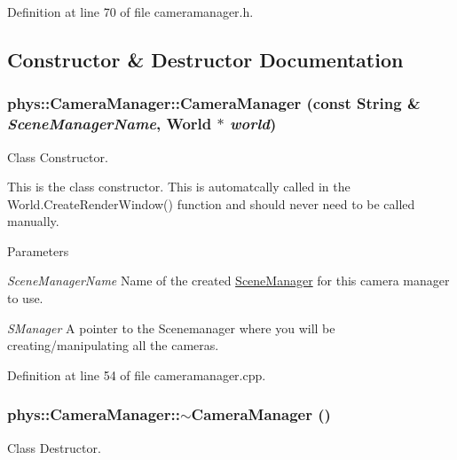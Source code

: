 Definition at line 70 of file cameramanager.h.



\subsection{Constructor \& Destructor Documentation}
\hypertarget{classphys_1_1CameraManager_a1e659b4a07645965194a33f8439fa4ea}{
\subsubsection[{CameraManager}]{\setlength{\rightskip}{0pt plus 5cm}phys::CameraManager::CameraManager (const {\bf String} \& {\em SceneManagerName}, \/  {\bf World} $\ast$ {\em world})}}
\label{d9/d91/classphys_1_1CameraManager_a1e659b4a07645965194a33f8439fa4ea}


Class Constructor. 

This is the class constructor. This is automatcally called in the World.CreateRenderWindow() function and should never need to be called manually. 
\begin{DoxyParams}{Parameters}
\item[{\em SceneManagerName}]Name of the created \hyperlink{classphys_1_1SceneManager}{SceneManager} for this camera manager to use. \item[{\em SManager}]A pointer to the Scenemanager where you will be creating/manipulating all the cameras. \end{DoxyParams}


Definition at line 54 of file cameramanager.cpp.

\hypertarget{classphys_1_1CameraManager_a0b0f032477309eb47b0302fd5eef198c}{
\subsubsection[{$\sim$CameraManager}]{\setlength{\rightskip}{0pt plus 5cm}phys::CameraManager::$\sim$CameraManager ()}}
\label{d9/d91/classphys_1_1CameraManager_a0b0f032477309eb47b0302fd5eef198c}


Class Destructor. 

